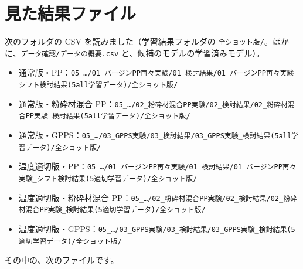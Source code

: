 \documentclass[paper=a4paper,fontsize=10.5pt,line_length=44zw,number_of_lines=40]{jlreq}
\begin{document}
\appendix
\section{見た結果ファイル}
次のフォルダの CSV を読みました（学習結果フォルダの \texttt{全ショット版/\allowbreak{}}。ほかに、\texttt{データ確認/\allowbreak{}データの概要.csv} と、候補のモデルの学習済みモデル）。
\begin{itemize}[itemsep=0.2ex,topsep=0.4ex]
\item 通常版・PP：\texttt{05\_\allowbreak{}…/\allowbreak{}01\_\allowbreak{}バージンPP再々実験/\allowbreak{}01\_\allowbreak{}検討結果/\allowbreak{}01\_\allowbreak{}バージンPP再々実験\_\allowbreak{}シフト検討結果(5all学習データ)/\allowbreak{}全ショット版/\allowbreak{}}
\item 通常版・粉砕材混合 PP：\texttt{05\_\allowbreak{}…/\allowbreak{}02\_\allowbreak{}粉砕材混合PP実験/\allowbreak{}02\_\allowbreak{}検討結果/\allowbreak{}02\_\allowbreak{}粉砕材混合PP実験\_\allowbreak{}検討結果(5all学習データ)/\allowbreak{}全ショット版/\allowbreak{}}
\item 通常版・GPPS：\texttt{05\_\allowbreak{}…/\allowbreak{}03\_\allowbreak{}GPPS実験/\allowbreak{}03\_\allowbreak{}検討結果/\allowbreak{}03\_\allowbreak{}GPPS実験\_\allowbreak{}検討結果(5all学習データ)/\allowbreak{}全ショット版/\allowbreak{}}
\item 温度適切版・PP：\texttt{05\_\allowbreak{}…/\allowbreak{}01\_\allowbreak{}バージンPP再々実験/\allowbreak{}01\_\allowbreak{}検討結果/\allowbreak{}01\_\allowbreak{}バージンPP再々実験\_\allowbreak{}シフト検討結果(5適切学習データ)/\allowbreak{}全ショット版/\allowbreak{}}
\item 温度適切版・粉砕材混合 PP：\texttt{05\_\allowbreak{}…/\allowbreak{}02\_\allowbreak{}粉砕材混合PP実験/\allowbreak{}02\_\allowbreak{}検討結果/\allowbreak{}02\_\allowbreak{}粉砕材混合PP実験\_\allowbreak{}検討結果(5適切学習データ)/\allowbreak{}全ショット版/\allowbreak{}}
\item 温度適切版・GPPS：\texttt{05\_\allowbreak{}…/\allowbreak{}03\_\allowbreak{}GPPS実験/\allowbreak{}03\_\allowbreak{}検討結果/\allowbreak{}03\_\allowbreak{}GPPS実験\_\allowbreak{}検討結果(5適切学習データ)/\allowbreak{}全ショット版/\allowbreak{}}
\end{itemize}
その中の、次のファイルです。
\end{document}
